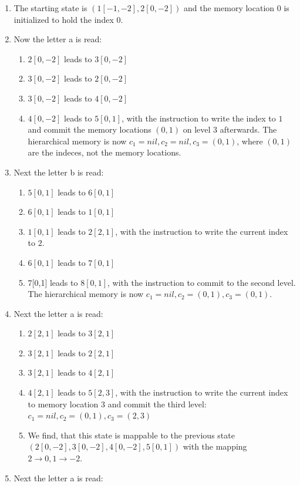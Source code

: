 \documentclass[english]{sigplanconf}
\theoremstyle{definition}
\begin{document}
\begin{enumerate}
\item The starting state is $(1[-1,-2],2[0,-2])$ and the memory location
$0$ is initialized to hold the index $0$.
\item Now the letter a is read:

\begin{enumerate}
\item $2[0,-2]$ leads to $3[0,-2]$
\item $3[0,-2]$ leads to $2[0,-2]$
\item $3[0,-2]$ leads to $4[0,-2]$
\item $4[0,-2]$ leads to $5[0,1]$, with the instruction to write the index
to $1$ and commit the memory locations $(0,1)$ on level $3$ afterwards.
The hierarchical memory is now $c_{1}=nil,c_{2}=nil,c_{3}=(0,1)$,
where $(0,1)$ are the indeces, not the memory locations.
\end{enumerate}
\item Next the letter b is read:

\begin{enumerate}
\item $5[0,1]$ leads to $6[0,1]$
\item $6[0,1]$ leads to $1[0,1]$
\item $1[0,1]$ leads to $2[2,1]$, with the instruction to write the current
index to $2$.
\item $6[0,1]$ leads to $7[0,1]$
\item 7{[}0,1{]} leads to $8[0,1]$, with the instruction to commit to the
second level. The hierarchical memory is now $c_{1}=nil,c_{2}=(0,1),c_{3}=(0,1)$.
\end{enumerate}
\item Next the letter a is read:

\begin{enumerate}
\item $2[2,1]$ leads to $3[2,1]$
\item $3[2,1]$ leads to $2[2,1]$
\item $3[2,1]$ leads to $4[2,1]$
\item $4[2,1]$ leads to $5[2,3]$, with the instruction to write the current
index to memory location $3$ and commit the third level: $c_{1}=nil,c_{2}=(0,1),c_{3}=(2,3)$
\item We find, that this state is mappable to the previous state $(2[0,-2],3[0,-2],4[0,-2],5[0,1])$
with the mapping $2\rightarrow0,1\rightarrow-2$.
\end{enumerate}
\item Next the letter a is read:


\end{enumerate}
\end{document}
